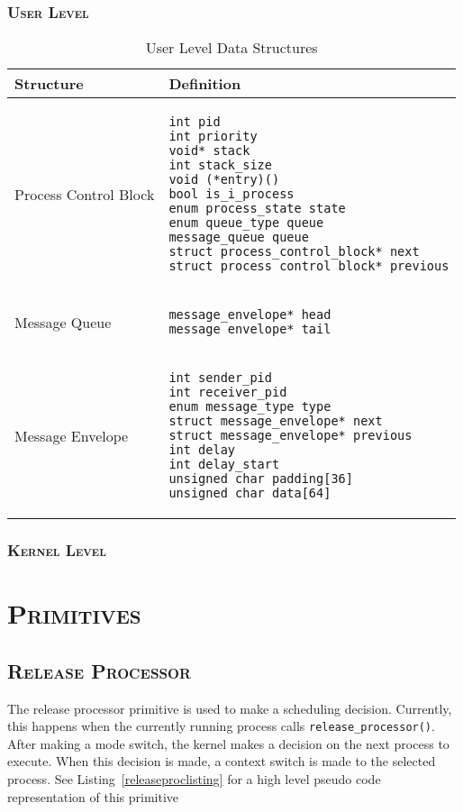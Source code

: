\documentclass[oneside]{report}
\begin{document}
\subsubsection{\textsc{User Level}}
\begin{table}[H]
    \caption{User Level Data Structures}
    \label{user_data_structs}
    \begin{tabular}{| l | p{8cm} |}
        \hline
        Structure & Definition \\
        \hline
        Process Control Block &
        \begin{verbatim}
int pid
int priority
void* stack
int stack_size
void (*entry)()
bool is_i_process
enum process_state state
enum queue_type queue
message_queue queue
struct process_control_block* next
struct process_control_block* previous
\end{verbatim} \\ 
        \hline
        Message Queue &
\begin{verbatim}
message_envelope* head
message_envelope* tail
\end{verbatim} \\
        \hline
        Message Envelope &
\begin{verbatim}
int sender_pid
int receiver_pid
enum message_type type
struct message_envelope* next
struct message_envelope* previous
int delay
int delay_start
unsigned char padding[36]
unsigned char data[64]
\end{verbatim} \\
        \hline
    \end{tabular}
\end{table}
\subsubsection{\textsc{Kernel Level}}

\section{\textsc{Primitives}}

\subsection{\textsc{Release Processor}}
The release processor primitive is used to make a scheduling decision.
Currently, this happens when the currently running process calls
\texttt{release\_processor()}. After making a mode switch, the kernel makes a
decision on the next process to execute. When this decision is made, a context
switch is made to the selected process. See Listing~\ref{releaseproclisting}
for a high level pseudo code representation of this primitive
\end{document}
